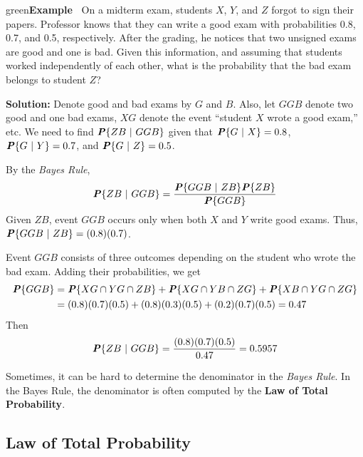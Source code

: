 \documentclass{article}
\newcounter{example}
\newenvironment{example}[1]{\begin{mybox}{green}{\refstepcounter{example}\textbf{Example~\theexample #1}}}{\end{mybox}}
\begin{document}
\begin{example}{}
On a midterm exam, students $X$, $Y$, and $Z$ forgot to sign their papers. Professor knows that they can write a good exam with probabilities 0.8, 0.7, and 0.5, respectively. After the grading, he notices that two unsigned exams are good and one is bad. Given this information, and assuming that students worked independently of each other, what is the probability that the bad exam belongs to student $Z$?

\textbf{Solution:}
Denote good and bad exams by $G$ and $B$. Also, let $GGB$ denote two good and one bad exams, $XG$ denote the event “student $X$ wrote a good exam,” etc. We need to find $\textbf{\textit{P}}\{ZB\ |\ GGB\}$ given that $\textbf{\textit{P}}\{G\ |\ X\} = 0.8$, $\textbf{\textit{P}}\{G\ |\ Y\} = 0.7$, and $\textbf{\textit{P}}\{G\ |\ Z\} = 0.5$.

By the \textit{Bayes Rule},
\begin{equation*}
    \textbf{\textit{P}}\{ZB\ |\ GGB\} = \frac{\textbf{\textit{P}}\{GGB\ |\ ZB\} \textbf{\textit{P}}\{ZB\}}{\textbf{\textit{P}}\{GGB\}}
\end{equation*}
Given $ZB$, event $GGB$ occurs only when both $X$ and $Y$ write good exams. Thus,
$\textbf{\textit{P}}\{GGB\ |\ ZB\} = (0.8)(0.7)$.

Event $GGB$ consists of three outcomes depending on the student who wrote the bad exam. Adding their probabilities, we get
\begin{align*}
    \textbf{\textit{P}}\{GGB\} &= \textbf{\textit{P}}\{XG \cap YG \cap ZB\} + \textbf{\textit{P}}\{XG \cap YB \cap ZG\} + \textbf{\textit{P}}\{XB \cap YG \cap ZG\}\\
    &= (0.8)(0.7)(0.5) + (0.8)(0.3)(0.5) + (0.2)(0.7)(0.5) = 0.47 
\end{align*}
Then
\begin{equation*}
    \textbf{\textit{P}}\{ZB\ |\ GGB\} = \frac{(0.8)(0.7)(0.5)}{0.47} = 0.5957
\end{equation*}
\end{example}

Sometimes, it can be hard to determine the denominator in the \textit{Bayes Rule}. In the Bayes Rule, the denominator is often computed by the \textbf{Law of Total Probability}.

\subsection{Law of Total Probability}
\end{document}
